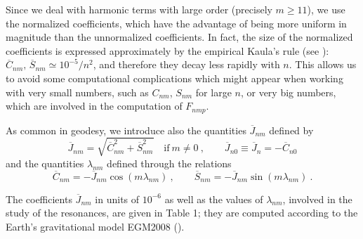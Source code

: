 \documentclass[12pt,reqno]{amsart}
\numberwithin{equation}{section}
\begin{document}
Since we deal with harmonic terms with large order (precisely
$m\geq 11$), we use the normalized coefficients, which have the advantage of being
more uniform in magnitude than  the unnormalized coefficients. In fact, the size of the normalized
coefficients is expressed approximately by the empirical Kaula's rule (see \cite{Kaula}):
$\overline{C}_{nm}, \, \overline{S}_{nm} \simeq 10^{-5}/n^2$, and therefore they decay less rapidly with $n$.
This allows us to avoid some computational complications which might appear when working with very small numbers,
such as $C_{nm}$, $S_{nm}$ for large $n$,
or very big numbers, which are involved in the computation of $F_{nmp}$.


As common in geodesy, we introduce also the quantities $\overline{J}_{nm}$ defined by
$$
\overline{J}_{nm} = \sqrt{\overline{C}_{nm}^2+\overline{S}_{nm}^2}   \quad \textrm{if} \ m\neq 0\ , \qquad
\overline{J}_{n0} \equiv \overline{J}_n= -\overline{C}_{n0}
$$
and the quantities $\lambda_{nm}$ defined through the relations
\begin{equation}\label{lambda_nm}
\overline{C}_{nm}=-\overline{J}_{nm} \cos(m \lambda_{nm}) \ , \qquad \overline{S}_{nm}=-\overline{J}_{nm} \sin(m \lambda_{nm}) \ .
\end{equation}


The coefficients $ \overline{J}_{nm}$ in units of $10^{-6}$ as well as the values of $\lambda_{nm}$, involved in the study of the resonances, are given
in Table 1; they are computed according to the Earth's gravitational model EGM2008 (\cite{EGM2008}).
\end{document}
